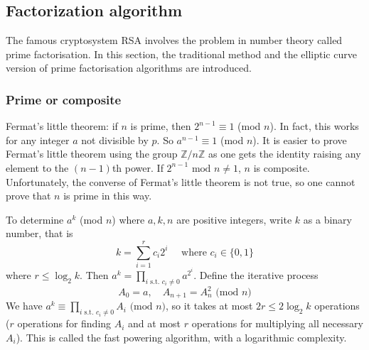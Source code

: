 \documentclass[12pt]{article}
\theoremstyle{remark}
\theoremstyle{definition}
\newcommand{\Z}[0]{\mathbb{Z}}
\begin{document}
    
    
    \subsection{Factorization algorithm}
    
    The famous cryptosystem RSA involves the problem in number theory called prime factorisation. In this section, the traditional method and the elliptic curve version of prime factorisation algorithms are introduced. 
    
    \subsubsection{Prime or composite}
        Fermat's little theorem: if $n$ is prime, then $2^{n-1} \equiv 1$ (mod $n$). In fact, this works for any integer $a$ not divisible by $p$. So $a^{n-1} \equiv 1$ (mod $n$). It is easier to prove Fermat's little theorem using the group $\Z/n\Z$ as one gets the identity raising any element to the $(n-1)$th power. If $2^{n-1}\text{ mod }n\neq 1$, $n$ is composite. Unfortunately, the converse of Fermat's little theorem is not true, so one cannot prove that $n$ is prime in this way.
    
        To determine $a^k$ (mod $n$) where $a, k, n$ are positive integers, write $k$ as a binary number, that is 
        $$k = \sum^{r}_{i=1} c_i 2^i \quad \text{ where } c_i \in \{0, 1\}$$
        where $r \leq \log_2{k}$. Then $a^k = \prod_{i \text{ s.t. } c_i \neq 0} a^{2^i}$. Define the iterative process 
        $$A_0 = a, \quad A_{n+1} = A_n^2 \text{ (mod } n\text{)}$$
        We have $a^k \equiv \prod_{i \text{ s.t. } c_i \neq 0} A_i \text{ (mod } n\text{)}$, so it takes at most $2r \leq 2\log_2{k}$ operations ($r$ operations for finding $A_i$ and at most $r$ operations for multiplying all necessary $A_i$). This is called the fast powering algorithm, with a logarithmic complexity. 
\end{document}

